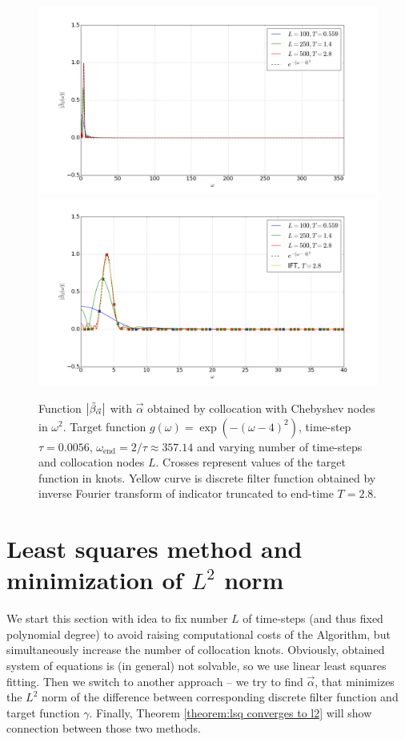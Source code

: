 \documentclass[a4paper,11pt,bibliography=totoc,listof=totoc,headinclude=true,cleardoublepage=empty,oneside]{scrbook}
\newcommand{\dffv}{\Tilde{\beta}_{\Vec{\alpha}}}
\newcommand{\e}{\mathrm{end}}
\begin{document}
\begin{figure}
    \centering
    \includegraphics[width=1\linewidth]{latex//images//cheb_coll/Figure_5.png}
    \includegraphics[width=1\linewidth]{latex//images//cheb_coll/Figure_6.png}
    \caption{Function $\left|\dffv\right|$ with $\Vec{\alpha}$ obtained by collocation with Chebyshev nodes in $\omega^2$. Target function $g(\omega) = \exp\left(-(\omega-4)^2\right)$, time-step $\tau = 0.0056$, $\omega_\e = 2/\tau \approx 357.14$ and varying number of time-steps and collocation nodes $L$. Crosses represent values of the target function in knots. Yellow curve is discrete filter function obtained by inverse Fourier transform of indicator truncated to end-time $T=2.8$.}
    \label{fig:cheb coll cont ex}
\end{figure}

\section{Least squares method and minimization of $L^2$ norm}
We start this section with idea to fix  number $L$ of time-steps (and thus fixed polynomial degree) to avoid raising computational costs of the Algorithm, but simultaneously increase the number of collocation knots. Obviously, obtained system of equations is (in general) not solvable, so we use linear least squares fitting. Then we switch to another approach -- we try to find $\Vec{\alpha}$, that minimizes the $L^2$ norm of the difference between corresponding discrete filter function and target function $\gamma$. Finally, Theorem \ref{theorem:lsq converges to l2} will show connection between those two methods.
\end{document}
